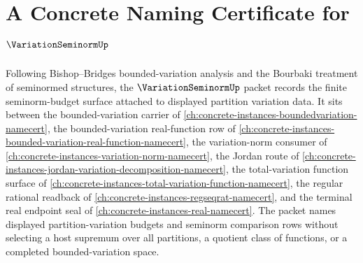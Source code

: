 \chapter{A Concrete Naming Certificate for $\VariationSeminormUp$}
\label{ch:concrete-instances-variation-seminorm-namecert}

Following Bishop--Bridges bounded-variation analysis and the Bourbaki treatment of seminormed structures, the $\VariationSeminormUp$ packet records the finite seminorm-budget surface attached to displayed partition variation data. It sits between the bounded-variation carrier of \autoref{ch:concrete-instances-boundedvariation-namecert}, the bounded-variation real-function row of \autoref{ch:concrete-instances-bounded-variation-real-function-namecert}, the variation-norm consumer of \autoref{ch:concrete-instances-variation-norm-namecert}, the Jordan route of \autoref{ch:concrete-instances-jordan-variation-decomposition-namecert}, the total-variation function surface of \autoref{ch:concrete-instances-total-variation-function-namecert}, the regular rational readback of \autoref{ch:concrete-instances-regseqrat-namecert}, and the terminal real endpoint seal of \autoref{ch:concrete-instances-real-namecert}. The packet names displayed partition-variation budgets and seminorm comparison rows without selecting a host supremum over all partitions, a quotient class of functions, or a completed bounded-variation space.

